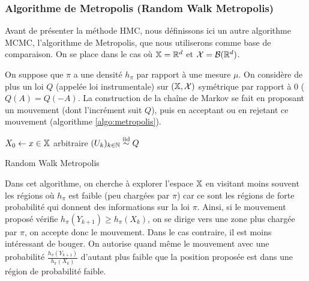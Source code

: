 \documentclass[10pt,a4paper]{article}
\begin{document}
\subsubsection{Algorithme de Metropolis (Random Walk Metropolis)}

Avant de présenter la méthode HMC, nous définissons ici un autre algorithme MCMC, l'algorithme de Metropolis, que nous utiliserons comme base de comparaison. On se place dans le cas où $\mathbb{X} = \mathbb{R}^d$ et $\mathcal{X} = \mathcal{B}(\mathbb{R}^d)$. 

On suppose que $\pi$ a une densité $h_\pi$ par rapport à une mesure $\mu$. On considère de plus un loi $Q$ (appelée loi instrumentale) sur $(\mathbb{X}, \mathcal{X})$ symétrique par rapport à $0$ ($Q(A) = Q(-A)$. La construction de la chaîne de Markov se fait en proposant un mouvement (dont l'incrément suit $Q$), puis en acceptant ou en rejetant ce mouvement (algorithme \ref{algo:metropolis}).

\begin{center}
	\begin{algorithm}[H]
		$X_0 \leftarrow x \in \mathbb{X}$ arbitraire\;
		$(U_k)_{k \in \mathbb{N}} \stackrel{\rm iid}{\sim} Q$ \;
		\caption{Random Walk Metropolis}
		\label{algo:metropolis}
	\end{algorithm}
\end{center}

Dans cet algorithme, on cherche à explorer l'espace $\mathbb{X}$ en visitant moins souvent les régions où $h_\pi$ est faible (peu chargées par $\pi$) car ce sont les régions de forte probabilité qui donnent des informations sur la loi $\pi$. Ainsi, si le mouvement proposé vérifie $h_\pi(Y_{k+1}) \geq h_\pi(X_k)$, on se dirige vers une zone plus chargée par $\pi$, on accepte donc le mouvement. Dans le cas contraire, il est moins intéressant de bouger. On autorise quand même le mouvement avec une probabilité $\frac{h_\pi(Y_{k+1})}{h_\pi(X_k)}$ d'autant plus faible que la position proposée est dans une région de probabilité faible.

\end{document}
